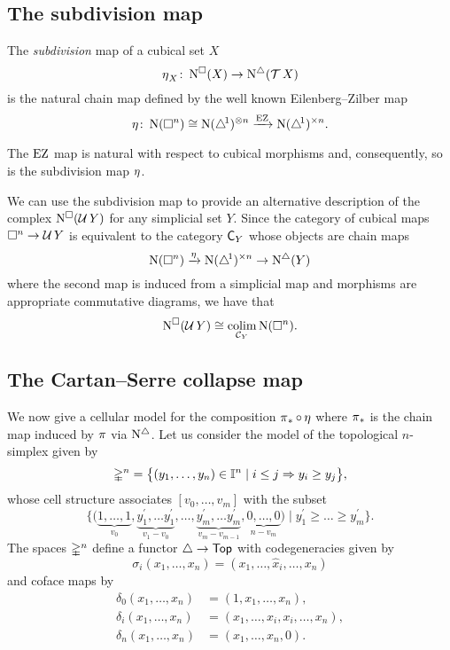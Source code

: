\subsection{The subdivision map}

The \textit{subdivision} map of a cubical set $X$
\[
\operatorname{\eta}_X \colon \operatorname{N^{\square}}(X) \to \operatorname{N^{\triangle}}(\operatorname{\mathcal{T}} X)
\]
is the natural chain map defined by the well known Eilenberg--Zilber map
\[
\operatorname{\eta} \colon \operatorname{N}(\square^n) \cong \operatorname{N}(\triangle^{\!1})^{\otimes n} \xrightarrow{\operatorname{EZ}} \operatorname{N} (\triangle^{\!1})^{\times n}.
\]

The $\operatorname{EZ}$ map is natural with respect to cubical morphisms and, consequently, so is the subdivision map $\operatorname{\eta}$.

We can use the subdivision map to provide an alternative description of the complex $\operatorname{N^{\square}}(\operatorname{\mathcal{U}} Y)$ for any simplicial set $Y$.
Since the category of cubical maps $\square^n \to \operatorname{\mathcal{U}} Y$ is equivalent to the category $\mathsf{C}_Y$ whose objects are chain maps
\[
\operatorname{N}(\square^n) \xrightarrow{\operatorname{\eta}} \operatorname{N} (\triangle^{\!1})^{\times n} \to \operatorname{N^{\triangle}}(Y)
\]
where the second map is induced from a simplicial map
and morphisms are appropriate commutative diagrams, we have that
\begin{equation} \label{e:alternative description of NUY}
\operatorname{N^{\square}}(\operatorname{\mathcal{U}} Y) \cong \operatorname*{colim}_{\mathcal{C}_Y} \operatorname{N}(\square^n).
\end{equation}

\subsection{The Cartan--Serre collapse map} \label{ss:cs collapse map}

We now give a cellular model for the composition $\operatorname{\pi}_\ast \circ \operatorname{\eta}$ where $\operatorname{\pi}_\ast$ is the chain map induced by $\operatorname{\pi}$ via $\operatorname{N^{\triangle}}$.
Let us consider the model of the topological $n$-simplex given by
\[
\mathbb{\Delta}^n = \big\{ (y_1, \dots, y_n) \in \mathbb{I}^n \mid i \leq j \Rightarrow y_i \geq y_j \big\},
\]
whose cell structure associates $[v_0, \dots, v_m]$ with the subset
\[
\Big\{ \big( \underbrace{1, \dots, 1}_{v_0}, \underbrace{y^\prime_1, \dots y^\prime_1}_{v_1-v_0}, \dots, \underbrace{y^\prime_m, \dots y^\prime_m}_{v_m-v_{m-1}}, \underbrace{0, \dots, 0}_{n-v_m} \big) \mid y^\prime_1 \geq \dots \geq y^\prime_m \Big\}.
\]
The spaces $\mathbb{\Delta}^n$ define a functor $\triangle \to \mathsf{Top}$ with codegeneracies given by
\[
\sigma_i(x_1, \dots, x_n) = (x_1, \dots, \widehat x_i, \dots, x_n)
\]
and coface maps by
\begin{align*}
\delta_0(x_1, \dots, x_n) &= (1, x_1, \dots, x_n), \\
\delta_i(x_1, \dots, x_n) &= (x_1, \dots, x_i, x_i, \dots, x_n), \\
\delta_n(x_1, \dots, x_n) &= (x_1, \dots, x_n, 0).
\end{align*}

